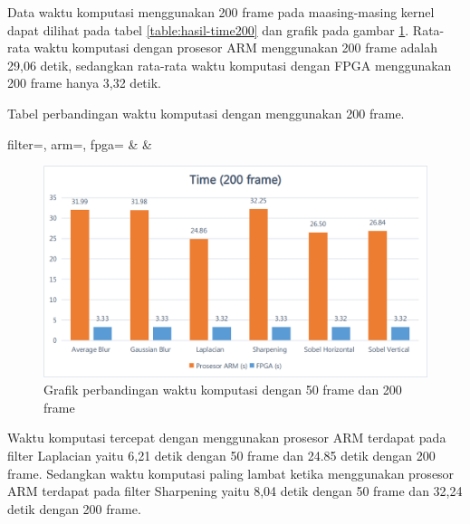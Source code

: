 Data waktu komputasi menggunakan 200 frame pada maasing-masing kernel dapat dilihat pada tabel \ref{table:hasil-time200} dan grafik pada gambar \ref{fig:chart-time200}. Rata-rata waktu komputasi dengan prosesor ARM menggunakan 200 frame adalah 29,06 detik, sedangkan rata-rata waktu komputasi dengan FPGA menggunakan 200 frame hanya 3,32 detik.
\begin{atable}
    \caption{Tabel perbandingan waktu komputasi dengan menggunakan 200 frame.}
    \label{table:hasil-time200}
        {
            filter=\filter, 
            arm=\arm, 
            fpga=\fpga}
        {
            \filter & 
            \arm & 
            \fpga }
\end{atable}

\begin{figure}[H]
    \centering
    \includegraphics[width=0.81\linewidth, center]{images/chart/chart-time200.png}
    \caption{Grafik perbandingan waktu komputasi dengan 50 frame dan 200 frame}
    \label{fig:chart-time200}
\end{figure}

Waktu komputasi tercepat dengan menggunakan prosesor ARM terdapat pada filter Laplacian yaitu 6,21 detik dengan 50 frame dan 24.85 detik dengan 200 frame. Sedangkan waktu komputasi paling lambat ketika menggunakan prosesor ARM terdapat pada filter Sharpening yaitu 8,04 detik dengan 50 frame dan 32,24 detik dengan 200 frame. 


